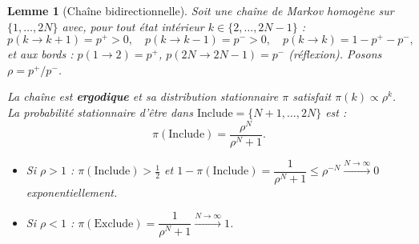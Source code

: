 \documentclass[12pt,a4paper]{article}
\newtheorem{lemma}[theorem]{Lemme}
\theoremstyle{remark}
\newcommand{\Inc}{\ensuremath{\mathrm{Include}}}
\newcommand{\Exc}{\ensuremath{\mathrm{Exclude}}}
\begin{document}
\begin{lemma}[Chaîne bidirectionnelle]\label{lem:ergodique}
Soit une chaîne de Markov homogène sur $\{1,\ldots,2N\}$ avec, pour tout état intérieur
$k\in\{2,\ldots,2N-1\}$ :
\[
  p(k\to k+1) = p^+ > 0, \quad p(k\to k-1) = p^- > 0, \quad p(k\to k) = 1-p^+-p^-,
\]
et aux bords : $p(1\to 2)=p^+$, $p(2N\to 2N-1)=p^-$ (réflexion).
Posons $\rho = p^+/p^-$.

La chaîne est \textbf{ergodique} et sa distribution stationnaire $\pi$ satisfait
$\pi(k) \propto \rho^k$.  La probabilité stationnaire d'être dans $\Inc = \{N+1,\ldots,2N\}$ est :
\[
  \boxed{\pi(\Inc) = \frac{\rho^N}{\rho^N + 1}.}
\]
\begin{itemize}
  \item Si $\rho > 1$ : $\pi(\Inc) > \tfrac{1}{2}$ et $1-\pi(\Inc) = \dfrac{1}{\rho^N+1} \le \rho^{-N} \xrightarrow{N\to\infty} 0$ exponentiellement.
  \item Si $\rho < 1$ : $\pi(\Exc) = \dfrac{1}{\rho^N+1} \xrightarrow{N\to\infty} 1$.
\end{itemize}
\end{lemma}
\end{document}
